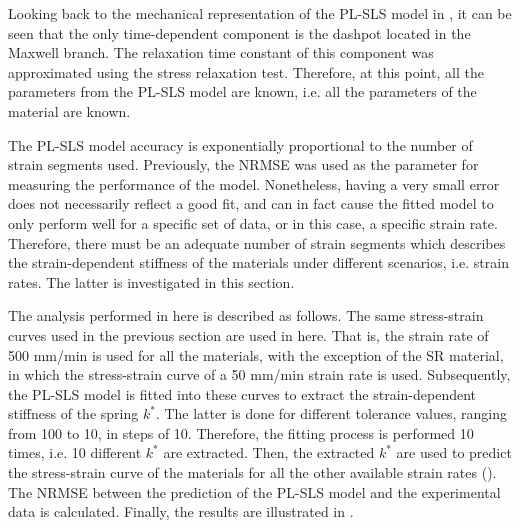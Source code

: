 Looking back to the mechanical representation of the PL-SLS model in , it can be seen that the only time-dependent component is the dashpot located in the Maxwell branch. The relaxation time constant of this component was approximated using the stress relaxation test. Therefore, at this point, all the parameters from the PL-SLS model are known, i.e. all the parameters of the material are known.

The PL-SLS model accuracy is exponentially proportional to the number of strain segments used. Previously, the NRMSE was used as the parameter for measuring the performance of the model. Nonetheless, having a very small error does not necessarily reflect a good fit, and can in fact cause the fitted model to only perform well for a specific set of data, or in this case, a specific strain rate. Therefore, there must be an adequate number of strain segments which describes the strain-dependent stiffness of the materials under different scenarios, i.e. strain rates. The latter is investigated in this section.

The analysis performed in here is described as follows. The same stress-strain curves used in the previous section are used in here. That is, the strain rate of 500 mm/min is used for all the materials, with the exception of the SR material, in which the stress-strain curve of a 50 mm/min strain rate is used. Subsequently, the PL-SLS model is fitted into these curves to extract the strain-dependent stiffness of the spring $k^*$. The latter is done for different tolerance values, ranging from 100 to 10, in steps of 10. Therefore, the fitting process is performed 10 times, i.e. 10 different $k^*$ are extracted. Then, the extracted $k^*$ are used to predict the stress-strain curve of the materials for all the other available strain rates (). The NRMSE between the prediction of the PL-SLS model and the experimental data is calculated. Finally, the results are illustrated in .

